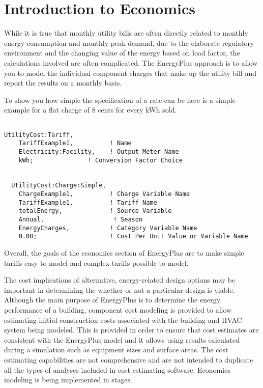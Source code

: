\section{Introduction to Economics}\label{introduction-to-economics}

While it is true that monthly utility bills are often directly related to monthly energy consumption and monthly peak demand, due to the elaborate regulatory environment and the changing value of the energy based on load factor, the calculations involved are often complicated. The EnergyPlus approach is to allow you to model the individual component charges that make up the utility bill and report the results on a monthly basis.

To show you how simple the specification of a rate can be here is a simple example for a flat charge of 8 cents for every kWh sold.

\begin{lstlisting}

UtilityCost:Tariff,
    TariffExample1,          ! Name
    Electricity:Facility,    ! Output Meter Name
    kWh;               ! Conversion Factor Choice


  UtilityCost:Charge:Simple,
    ChargeExample1,          ! Charge Variable Name
    TariffExample1,          ! Tariff Name
    totalEnergy,             ! Source Variable
    Annual,                   ! Season
    EnergyCharges,           ! Category Variable Name
    0.08;                    ! Cost Per Unit Value or Variable Name
\end{lstlisting}

Overall, the goals of the economics section of EnergyPlus are to make simple tariffs easy to model and complex tariffs possible to model.

The cost implications of alternative, energy-related design options may be important in determining the whether or not a particular design is viable.
Although the main purpose of EnergyPlus is to determine the energy performance of a building, component cost modeling is provided to allow estimating initial construction costs associated with the building and HVAC system being modeled.
This is provided in order to ensure that cost estimates are consistent with the EnergyPlus model and it allows using results calculated during a simulation such as equipment sizes and surface areas.
The cost estimating capabilities are not comprehensive and are not intended to duplicate all the types of analyses included in cost estimating software.
Economics modeling is being implemented in stages.

